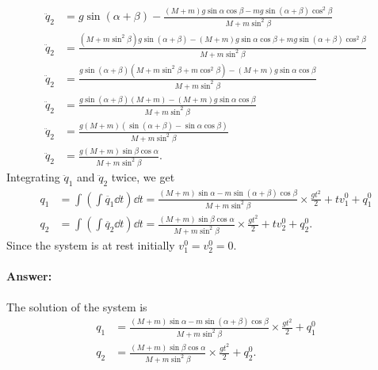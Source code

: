\begin{align*}
    \ddot{q}_2 &= g \sin (\alpha + \beta) - \frac{(M + m) g \sin \alpha \cos \beta - m g \sin(\alpha + \beta) \cos^2 \beta}{M + m \sin^2 \beta}\\
    \ddot{q}_2 &= \frac
    {
        (M + m \sin^2 \beta) g \sin (\alpha + \beta) -
        (M + m) g \sin \alpha \cos \beta +
        m g \sin(\alpha + \beta) \cos^2\beta
    }
    {M + m \sin^2 \beta}\\
    \ddot{q}_2 &= \frac
    {
        g \sin (\alpha + \beta) (M + m\sin^2 \beta + m \cos^2 \beta) -
        (M + m) g \sin\alpha \cos\beta
    }
    {M + m \sin^2 \beta}\\
    \ddot{q}_2 &= \frac
    {
        g \sin (\alpha + \beta) (M + m) -
        (M + m) g \sin\alpha \cos\beta
    }
    {M + m \sin^2 \beta}\\
    \ddot{q}_2 &= \frac
    {
        g(M + m)
        (\sin (\alpha + \beta) -
        \sin\alpha \cos\beta)
    }
    {M + m \sin^2 \beta}\\
    \ddot{q}_2 &= \frac
    {
        g(M + m) \sin\beta \cos\alpha
    }
    {M + m \sin^2 \beta}.
\end{align*}
Integrating $\ddot{q}_1$ and $\ddot{q}_2$ twice, we get 
\begin{align}
    q_1 &= \int\left(\int \ddot{q_1} \dd t\right) \dd t = \frac{(M + m)  \sin \alpha - m  \sin(\alpha + \beta) \cos\beta}{M + m \sin^2 \beta} \times \frac{g t^2}{2} + t v_1^0 + q_1^0\\
    q_2 &= \int\left(\int \ddot{q_2} \dd t\right) \dd t =\frac{(M + m) \sin\beta \cos\alpha }{M + m \sin^2 \beta} \times \frac{g t^2}{2} + t v_2^0 + q_2^0.
\end{align}
Since the system is at rest initially $v_1^0 = v_2^0 = 0$.

\paragraph{Answer:} The solution of the system is 
\begin{align*}
    q_1 &= \frac{(M + m)  \sin \alpha - m  \sin(\alpha + \beta) \cos\beta}{M + m \sin^2 \beta} \times \frac{g t^2}{2} + q_1^0\\
    q_2 &= \frac{(M + m) \sin\beta \cos\alpha }{M + m \sin^2 \beta} \times \frac{g t^2}{2} + q_2^0.
\end{align*}
